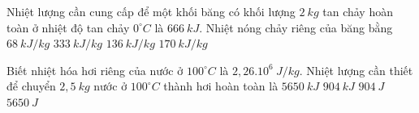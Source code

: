 \begin{ex}
Nhiệt lượng cần cung cấp để một khối băng có khối lượng $2\ kg$ tan chảy hoàn toàn ở nhiệt độ tan chảy $0^\circ C$ là $666\ kJ$. Nhiệt nóng chảy riêng của băng bằng
\choice
{$68\ kJ/kg$}
{\True $333\ kJ/kg$}
{$136\ kJ/kg$}
{$170\ kJ/kg$}
\end{ex}
\begin{ex}
Biết nhiệt hóa hơi riêng của nước ở $100^\circ C$ là $2,26 . 10^6\ J/kg$. Nhiệt lượng cần thiết để chuyển $2,5\ kg$ nước ở $100^\circ C$ thành hơi hoàn toàn là
\choice
{\True $5650\ kJ$}
{$904\ kJ$}
{$904\ J$}
{$5650\ J$}
\end{ex}
